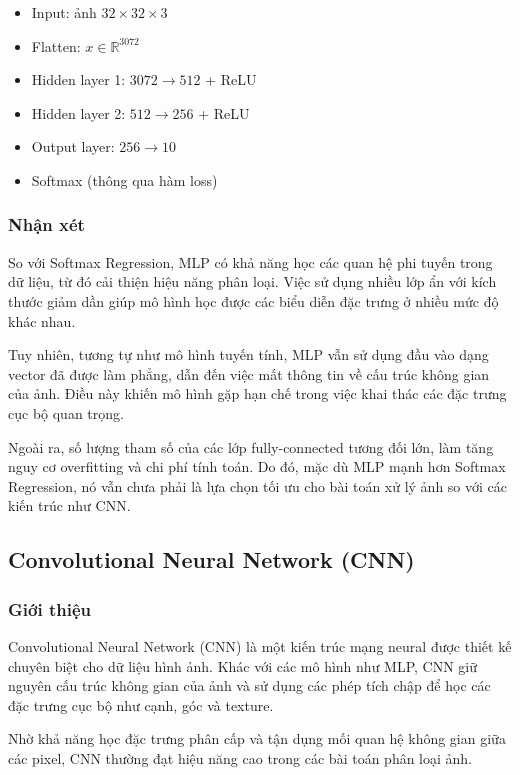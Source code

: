 \begin{itemize}
\item Input: ảnh $32 \times 32 \times 3$
\item Flatten: $x \in \mathbb{R}^{3072}$
\item Hidden layer 1: $3072 \rightarrow 512$ + ReLU
\item Hidden layer 2: $512 \rightarrow 256$ + ReLU
\item Output layer: $256 \rightarrow 10$
\item Softmax (thông qua hàm loss)
\end{itemize}

\subsubsection{Nhận xét}

So với Softmax Regression, MLP có khả năng học các quan hệ phi tuyến trong dữ liệu, từ đó cải thiện hiệu năng phân loại. Việc sử dụng nhiều lớp ẩn với kích thước giảm dần giúp mô hình học được các biểu diễn đặc trưng ở nhiều mức độ khác nhau.

Tuy nhiên, tương tự như mô hình tuyến tính, MLP vẫn sử dụng đầu vào dạng vector đã được làm phẳng, dẫn đến việc mất thông tin về cấu trúc không gian của ảnh. Điều này khiến mô hình gặp hạn chế trong việc khai thác các đặc trưng cục bộ quan trọng.

Ngoài ra, số lượng tham số của các lớp fully-connected tương đối lớn, làm tăng nguy cơ overfitting và chi phí tính toán. Do đó, mặc dù MLP mạnh hơn Softmax Regression, nó vẫn chưa phải là lựa chọn tối ưu cho bài toán xử lý ảnh so với các kiến trúc như CNN.

\subsection{Convolutional Neural Network (CNN)}

\subsubsection{Giới thiệu}

Convolutional Neural Network (CNN) là một kiến trúc mạng neural được thiết kế chuyên biệt cho dữ liệu hình ảnh. Khác với các mô hình như MLP, CNN giữ nguyên cấu trúc không gian của ảnh và sử dụng các phép tích chập để học các đặc trưng cục bộ như cạnh, góc và texture.

Nhờ khả năng học đặc trưng phân cấp và tận dụng mối quan hệ không gian giữa các pixel, CNN thường đạt hiệu năng cao trong các bài toán phân loại ảnh.

